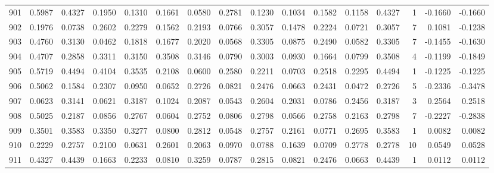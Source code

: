 \begin{tabular}{lrrrrrrrrrrrrrrr}
901 &      0.5987 &  0.4327 &  0.1950 &  0.1310 &  0.1661 &  0.0580 &  0.2781 &  0.1230 &  0.1034 &  0.1582 &   0.1158 &     0.4327 &      1 &                   -0.1660 &                    -0.1660 \\
902 &      0.1976 &  0.0738 &  0.2602 &  0.2279 &  0.1562 &  0.2193 &  0.0766 &  0.3057 &  0.1478 &  0.2224 &   0.0721 &     0.3057 &      7 &                    0.1081 &                    -0.1238 \\
903 &      0.4760 &  0.3130 &  0.0462 &  0.1818 &  0.1677 &  0.2020 &  0.0568 &  0.3305 &  0.0875 &  0.2490 &   0.0582 &     0.3305 &      7 &                   -0.1455 &                    -0.1630 \\
904 &      0.4707 &  0.2858 &  0.3311 &  0.3150 &  0.3508 &  0.3146 &  0.0790 &  0.3003 &  0.0930 &  0.1664 &   0.0799 &     0.3508 &      4 &                   -0.1199 &                    -0.1849 \\
905 &      0.5719 &  0.4494 &  0.4104 &  0.3535 &  0.2108 &  0.0600 &  0.2580 &  0.2211 &  0.0703 &  0.2518 &   0.2295 &     0.4494 &      1 &                   -0.1225 &                    -0.1225 \\
906 &      0.5062 &  0.1584 &  0.2307 &  0.0950 &  0.0652 &  0.2726 &  0.0821 &  0.2476 &  0.0663 &  0.2431 &   0.0472 &     0.2726 &      5 &                   -0.2336 &                    -0.3478 \\
907 &      0.0623 &  0.3141 &  0.0621 &  0.3187 &  0.1024 &  0.2087 &  0.0543 &  0.2604 &  0.2031 &  0.0786 &   0.2456 &     0.3187 &      3 &                    0.2564 &                     0.2518 \\
908 &      0.5025 &  0.2187 &  0.0856 &  0.2767 &  0.0604 &  0.2752 &  0.0806 &  0.2798 &  0.0566 &  0.2758 &   0.2163 &     0.2798 &      7 &                   -0.2227 &                    -0.2838 \\
909 &      0.3501 &  0.3583 &  0.3350 &  0.3277 &  0.0800 &  0.2812 &  0.0548 &  0.2757 &  0.2161 &  0.0771 &   0.2695 &     0.3583 &      1 &                    0.0082 &                     0.0082 \\
910 &      0.2229 &  0.2757 &  0.2100 &  0.0631 &  0.2601 &  0.2063 &  0.0970 &  0.0788 &  0.1639 &  0.0709 &   0.2778 &     0.2778 &     10 &                    0.0549 &                     0.0528 \\
911 &      0.4327 &  0.4439 &  0.1663 &  0.2233 &  0.0810 &  0.3259 &  0.0787 &  0.2815 &  0.0821 &  0.2476 &   0.0663 &     0.4439 &      1 &                    0.0112 &                     0.0112 \\

\end{tabular}
